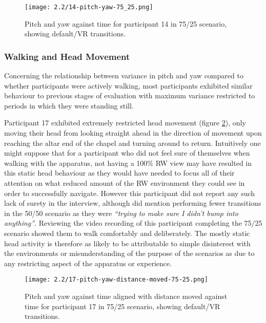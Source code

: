 \begin{figure}[h]
	\begin{center}
	\texttt{[image: 2.2/14-pitch-yaw-75\_25.png]}
	\caption{Pitch and yaw against time for participant 14 in 75/25 scenario, showing default/VR transitions.}
	\label{14-pitch-yaw-75_25.png}
	\end{center}
\end{figure}


\subsubsection{Walking and Head Movement}

Concerning the relationship between variance in pitch and yaw compared to whether participants were actively walking, most participants exhibited similar behaviour to previous stages of evaluation with maximum variance restricted to periods in which they were standing still.

Participant 17 exhibited extremely restricted head movement (figure \ref{17-pitch-yaw-distance-moved-75-25.png}), only moving their head from looking straight ahead in the direction of movement upon reaching the altar end of the chapel and turning around to return. Intuitively one might suppose that for a participant who did not feel sure of themselves when walking with the apparatus, not having a 100\% RW view may have resulted in this static head behaviour as they would have needed to focus all of their attention on what reduced amount of the RW environment they could see in order to successfully navigate. However this participant did not report any such lack of surety in the interview, although did mention performing fewer transitions in the 50/50 scenario as they were \textit{``trying to make sure I didn't bump into anything''}. Reviewing the video recording of this participant completing the 75/25 scenario showed them to walk comfortably and deliberately. The mostly static head activity is therefore as likely to be attributable to simple disinterest with the environments or misunderstanding of the purpose of the scenarios as due to any restricting aspect of the apparatus or experience.

\begin{figure}[h]
	\begin{center}
	\texttt{[image: 2.2/17-pitch-yaw-distance-moved-75-25.png]}
	\caption{Pitch and yaw against time aligned with distance moved against time for participant 17 in 75/25 scenario, showing default/VR transitions.}
	\label{17-pitch-yaw-distance-moved-75-25.png}
	\end{center}
\end{figure}

